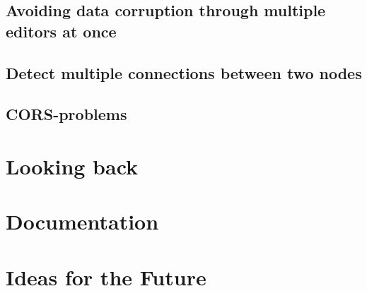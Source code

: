 \section{Avoiding data corruption through multiple editors at once}
\section{Detect multiple connections between two nodes}
\section{CORS-problems}

\chapter{Looking back}

\chapter{Documentation}

\chapter{Ideas for the Future}
